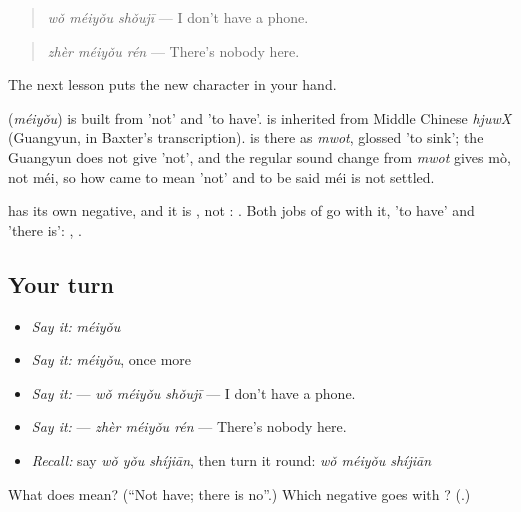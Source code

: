 \begin{quote}
\textbf{} \emph{wǒ méiyǒu shǒujī} — I don't have a phone.
\end{quote}

\begin{quote}
\textbf{} \emph{zhèr méiyǒu rén} — There's nobody here.
\end{quote}

The next lesson puts the new character in your hand.

\begin{cousinweb}
\textbf{} (\emph{méiyǒu}) is built from  'not' and  'to have'.  is inherited from Middle Chinese \emph{hjuwX} (Guangyun, in Baxter's transcription).  is there as \emph{mwot}, glossed 'to sink'; the Guangyun does not give 'not', and the regular sound change from \emph{mwot} gives mò, not méi, so how  came to mean 'not' and to be said méi is not settled.
\end{cousinweb}

\begin{grammarlens}[title={What you've built}]
 has its own negative, and it is , not : . Both jobs of  go with it, 'to have' and 'there is': , .
\end{grammarlens}

\subsection*{Your turn}
\begin{itemize}
\raggedright
  \item \emph{Say it:} \emph{méiyǒu}
  \item \emph{Say it:} \emph{méiyǒu}, once more
  \item \emph{Say it:}  — \emph{wǒ méiyǒu shǒujī} — I don't have a phone.
  \item \emph{Say it:}  — \emph{zhèr méiyǒu rén} — There's nobody here.
  \item \emph{Recall:} say \emph{wǒ yǒu shíjiān}, then turn it round: \emph{wǒ méiyǒu shíjiān}
\end{itemize}

\begin{tcolorbox}[breakable,colback=teal!4,colframe=teal!35!black,title={Before you move on}]
What does  mean? (\textquotedblleft{}Not have; there is no\textquotedblright{}.) Which negative goes with ? (\textbf{}.)
\end{tcolorbox}

